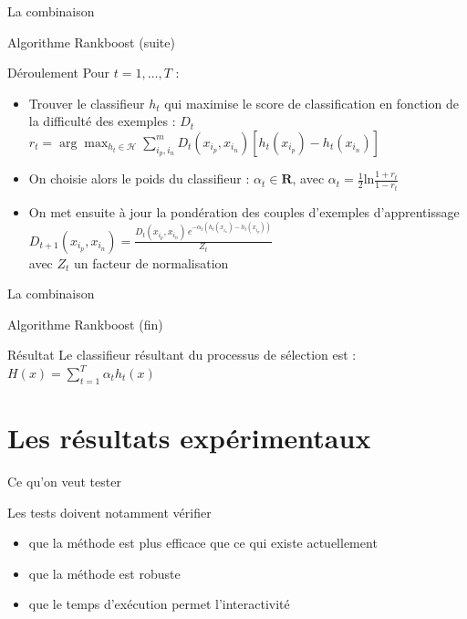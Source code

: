 \documentclass{beamer}
\begin{document}
\begin{frame}{La combinaison}
	
	Algorithme Rankboost (suite)

    \begin{block}{Déroulement}
    Pour $t = 1,\ldots,T$ :

	\begin{itemize}
    \item Trouver le classifieur $h_{t}$ qui maximise le score de classification en fonction de la difficulté des exemples : $D_{t}$
    $r_{t} = \arg \max_{h_{t} \in \mathcal{H}} \sum_{i_p,i_n}^{m} D_{t}(x_{i_p},x_{i_n})[h_{t}(x_{i_p})-h_{t}(x_{i_n})]$
    \item On choisie alors le poids du classifieur : $\alpha_{t} \in \mathbf{R}$, avec $\alpha_{t}=\frac{1}{2}\textrm{ln}\frac{1+r_{t}}{1-r_{t}}$ 
    \item On met ensuite à jour la pondération des couples d'exemples d'apprentissage
    $D_{t+1}(x_{i_p},x_{i_n}) = \frac{ D_{t}(x_{i_p},x_{i_n}) \, e^{- \alpha_{t}(h_{t}(x_{i_n})-h_{t}(x_{i_p}))} }{ Z_{t} }$\\
    avec $Z_{t}$ un facteur de normalisation
	\end{itemize}
    \end{block}

\end{frame}

\begin{frame}{La combinaison}
	
	Algorithme Rankboost (fin)

    \begin{block}{Résultat}
    Le classifieur résultant du processus de sélection est :\\
    $H(x) = \sum_{t=1}^{T} \alpha_{t}h_{t}(x)$
    \end{block}

\end{frame}


\section{Les résultats expérimentaux}

\begin{frame}{Ce qu'on veut tester}
	
	Les tests doivent notamment vérifier
	\begin{itemize}
	\item que la méthode est plus efficace que ce qui existe actuellement
	\item que la méthode est robuste
	\item que le temps d'exécution permet l'interactivité
	\end{itemize}

\end{frame}
\end{document}
